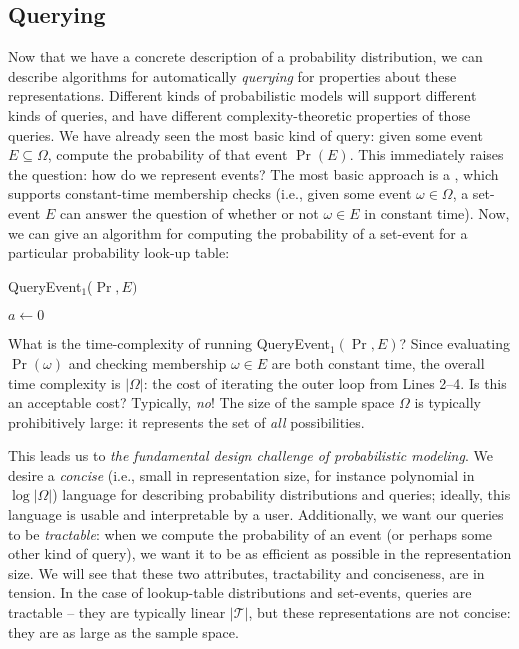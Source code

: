 \documentclass{tufte-handout}
\begin{document}
\subsection{Querying}
Now that we have a concrete description of a probability distribution, we can
describe algorithms for automatically \emph{querying} for properties about these
representations. Different kinds of probabilistic models will support different 
kinds of queries, and have different complexity-theoretic properties of those queries. 
We have already seen the most basic kind of query: given some 
event $E \subseteq \Omega$, compute the probability of that event $\Pr(E)$. 
This immediately raises the question: how do we represent events? The most basic 
approach is a , which supports constant-time membership checks 
(i.e., given some event $\omega \in \Omega$, a set-event $E$ can answer the question 
of whether or not $\omega \in E$ in constant time).
Now, we can give an algorithm for computing the probability of a set-event for 
a particular probability look-up table:

\begin{algorithm}
    \caption{QueryEvent$_1$($\Pr, E)$}\label{alg:eventprob}
    $a \leftarrow 0$\;
\end{algorithm}

What is the time-complexity of running QueryEvent$_1(\Pr, E)$? Since evaluating
$\Pr(\omega)$ and checking membership $\omega \in E$ are both constant time, the
overall time complexity is $|\Omega|$: the cost of iterating the outer loop from
Lines 2--4.  Is this an acceptable cost? Typically, \emph{no}! The size of the
sample space $\Omega$ is typically prohibitively large: it represents the set of
\emph{all} possibilities. 

This leads us to \emph{the fundamental design challenge of probabilistic modeling}.
We desire a \emph{concise} (i.e., small in representation size, for instance polynomial in $\log |\Omega|$) language for describing 
probability distributions and queries; ideally, this language is usable and interpretable 
by a user. Additionally, we want our queries to be \emph{tractable}: when we 
compute the probability of an event (or perhaps some other kind of query), we want it to 
be as efficient as possible in the representation size. We will see that these two attributes,
tractability and conciseness, are in tension. In the case of lookup-table
distributions and set-events, queries are tractable -- they are typically linear $|\mathcal{T}|$,
but these representations are not concise: they are as large as the sample space.
\end{document}
